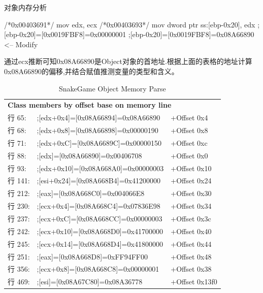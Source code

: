 \documentclass[AutoFakeBold,AutoFakeSlant]{beamer}
\begin{document}
\begin{frame}[fragile]{对象内存分析}
    \tiny
    \linespread{0.5} \selectfont
    \begin{x86asmcode}
        /*0x00403691*/    mov edx, ecx
        /*0x00403693*/    mov dword ptr ss:[ebp-0x20], edx
        ;[ebp-0x20]=[0x0019FBF8]=0x00000001
        ;[ebp-0x20]=[0x0019FBF8]=0x08A66890  <-- Modify
    \end{x86asmcode}
    通过ecx推断可知0x08A66890是Object对象的首地址.根据上面的表格的地址计算0x08A66890的偏移,并结合赋值推测变量的类型和含义。
    \tiny
    \begin{table}[htbp] %
        \centering %
        \caption{SnakeGame Object Memory Parse}
        \begin{tabular}{p{1cm}p{5cm}p{4cm}}
            \toprule
            \multicolumn{3}{l}{\textbf{Class members by offset base on memory line}} \\
            行  65: & ;[edx+0x4]=[0x08A66894]=0x08A66890  & +Offset 0x4               \\[0.6ex]
            行  68: & ;[edx+0x8]=[0x08A66898]=0x00000190  & +Offset 0x8               \\[0.6ex]
            行  71: & ;[edx+0xC]=[0x08A6689C]=0x00000150  & +Offset 0xc               \\[0.6ex]
            行  88: & ;[edx]=[0x08A66890]=0x00406708      & +Offset 0x0               \\[0.6ex]
            行  93: & ;[edx+0x10]=[0x08A668A0]=0x00000003 & +Offset 0x10              \\[0.6ex]
            行 141: & ;[esi+0x24]=[0x08A668B4]=0x41200000 & +Offset 0x24              \\[0.6ex]
            行 212: & ;[eax]=[0x08A668C0]=0x004066E8      & +Offset 0x30              \\[0.6ex]
            行 230: & ;[ecx+0x4]=[0x08A668C4]=0x07836E98  & +Offset 0x34              \\[0.6ex]
            行 237: & ;[ecx+0xC]=[0x08A668CC]=0x00000003  & +Offset 0x3c              \\[0.6ex]
            行 242: & ;[ecx+0x10]=[0x08A668D0]=0x41700000 & +Offset 0x40              \\[0.6ex]
            行 245: & ;[ecx+0x14]=[0x08A668D4]=0x41800000 & +Offset 0x44              \\[0.6ex]
            行 251: & ;[eax]=[0x08A668D8]=0xFF94FF00      & +Offset 0x48              \\[0.6ex]
            行 356: & ;[ecx+0x8]=[0x08A668C8]=0x00000001  & +Offset 0x38              \\[0.6ex]
            行 469: & ;[esi]=[0x08A67C80]=0x08A36778      & +Offset 0x13f0            \\[0.6ex]
        \end{tabular}
    \end{table}
\end{frame}
\end{document}
